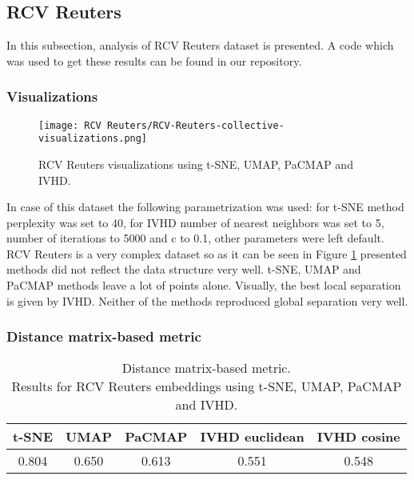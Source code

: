 \documentclass[12pt]{article}
\begin{document}

\clearpage
\subsection{RCV Reuters}
In this subsection, analysis of RCV Reuters dataset is presented. A code which was used to get these results can be found in our repository\cite{github-reuters}.

\subsubsection{Visualizations}
\begin{figure}[h]
    \centering
    \texttt{[image: RCV Reuters/RCV-Reuters-collective-visualizations.png]}
    \caption{RCV Reuters visualizations using t-SNE, UMAP, PaCMAP and IVHD.}
    \label{fig:reuters_vis}
\end{figure}
\clearpage

In case of this dataset the following parametrization was used: for t-SNE method perplexity was set to 40, for IVHD number of nearest neighbors was set to 5, number of iterations to 5000 and c to 0.1, other parameters were left default. RCV Reuters is a very complex dataset so as it can be seen in Figure \ref{fig:reuters_vis} presented methods did not reflect the data structure very well. t-SNE, UMAP and PaCMAP methods leave a lot of points alone. Visually, the best local separation is given by IVHD. Neither of the methods reproduced global separation very well.

\subsubsection{Distance matrix-based metric}
\begin{table}[h]
\centering
\caption{Distance matrix-based metric. \\ Results for RCV Reuters embeddings using t-SNE, UMAP, PaCMAP and IVHD.}
\begin{tabular}{|c|c|l|l|l|}
\hline
\textbf{t-SNE} & \textbf{UMAP} & \textbf{PaCMAP}            & \textbf{IVHD euclidean}    & \textbf{IVHD cosine}       \\ \hline
0.804          & 0.650         & \multicolumn{1}{c|}{0.613} & \multicolumn{1}{c|}{0.551} & \multicolumn{1}{c|}{0.548} \\ \hline
\end{tabular}
\end{table}
\end{document}
